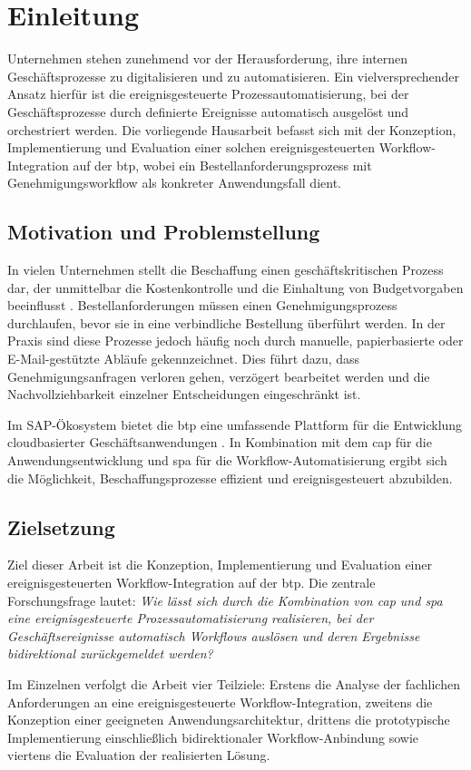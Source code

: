 \section{Einleitung}

Unternehmen stehen zunehmend vor der Herausforderung, ihre internen Geschäftsprozesse zu digitalisieren und zu automatisieren. Ein vielversprechender Ansatz hierfür ist die ereignisgesteuerte Prozessautomatisierung, bei der Geschäftsprozesse durch definierte Ereignisse automatisch ausgelöst und orchestriert werden. Die vorliegende Hausarbeit befasst sich mit der Konzeption, Implementierung und Evaluation einer solchen ereignisgesteuerten Workflow-Integration auf der \gls{btp}, wobei ein Bestellanforderungsprozess mit Genehmigungsworkflow als konkreter Anwendungsfall dient.

\subsection{Motivation und Problemstellung}

In vielen Unternehmen stellt die Beschaffung einen geschäftskritischen Prozess dar, der unmittelbar die Kostenkontrolle und die Einhaltung von Budgetvorgaben beeinflusst \citep{weske2019bpm, dumas2018bpm}. Bestellanforderungen müssen einen Genehmigungsprozess durchlaufen, bevor sie in eine verbindliche Bestellung überführt werden. In der Praxis sind diese Prozesse jedoch häufig noch durch manuelle, papierbasierte oder E-Mail-gestützte Abläufe gekennzeichnet. Dies führt dazu, dass Genehmigungsanfragen verloren gehen, verzögert bearbeitet werden und die Nachvollziehbarkeit einzelner Entscheidungen eingeschränkt ist.

Im SAP-Ökosystem bietet die \gls{btp} eine umfassende Plattform für die Entwicklung cloudbasierter Geschäftsanwendungen \citep{sap2024btp}. In Kombination mit dem \gls{cap} für die Anwendungsentwicklung und \gls{spa} für die Workflow-Automatisierung ergibt sich die Möglichkeit, Beschaffungsprozesse effizient und ereignisgesteuert abzubilden.

\subsection{Zielsetzung}

Ziel dieser Arbeit ist die Konzeption, Implementierung und Evaluation einer ereignisgesteuerten Workflow-Integration auf der \gls{btp}. Die zentrale Forschungsfrage lautet: \textit{Wie lässt sich durch die Kombination von \gls{cap} und \gls{spa} eine ereignisgesteuerte Prozessautomatisierung realisieren, bei der Geschäftsereignisse automatisch Workflows auslösen und deren Ergebnisse bidirektional zurückgemeldet werden?}

Im Einzelnen verfolgt die Arbeit vier Teilziele: Erstens die Analyse der fachlichen Anforderungen an eine ereignisgesteuerte Workflow-Integration, zweitens die Konzeption einer geeigneten Anwendungsarchitektur, drittens die prototypische Implementierung einschließlich bidirektionaler Workflow-Anbindung sowie viertens die Evaluation der realisierten Lösung.
